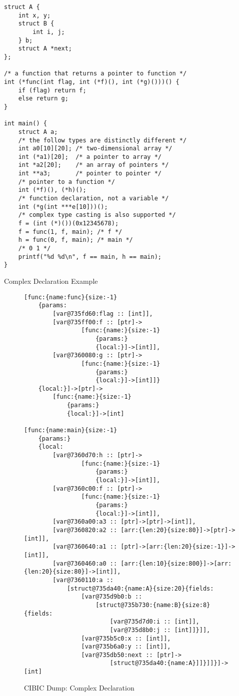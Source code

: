 \documentclass[10pt, a4paper]{article}
\begin{document}
\begin{listing}[H]
    \centering
    \begin{verbatim}
struct A {
    int x, y;
    struct B {
        int i, j;
    } b;
    struct A *next;
};

/* a function that returns a pointer to function */
int (*func(int flag, int (*f)(), int (*g)()))() {
    if (flag) return f;
    else return g;
}

int main() {
    struct A a;
    /* the follow types are distinctly different */
    int a0[10][20]; /* two-dimensional array */
    int (*a1)[20];  /* a pointer to array */
    int *a2[20];    /* an array of pointers */
    int **a3;       /* pointer to pointer */
    /* pointer to a function */
    int (*f)(), (*h)();
    /* function declaration, not a variable */
    int (*g(int ***e[10]))();
    /* complex type casting is also supported */
    f = (int (*)())(0x12345678);
    f = func(1, f, main); /* f */
    h = func(0, f, main); /* main */
    /* 0 1 */
    printf("%d %d\n", f == main, h == main);
}
    \end{verbatim}
 \caption {Complex Declaration Example}
\end{listing}
\begin{figure}[H]
    \centering
    \begin{BVerbatim}
[func:{name:func}{size:-1}
    {params:
        [var@735fd60:flag :: [int]],
        [var@735ff00:f :: [ptr]->
                [func:{name:}{size:-1}
                    {params:}
                    {local:}]->[int]],
        [var@7360080:g :: [ptr]->
                [func:{name:}{size:-1}
                    {params:}
                    {local:}]->[int]]}
    {local:}]->[ptr]->
        [func:{name:}{size:-1}
            {params:}
            {local:}]->[int]

[func:{name:main}{size:-1}
    {params:}
    {local:
        [var@7360d70:h :: [ptr]->
                [func:{name:}{size:-1}
                    {params:}
                    {local:}]->[int]],
        [var@7360c00:f :: [ptr]->
                [func:{name:}{size:-1}
                    {params:}
                    {local:}]->[int]],
        [var@7360a00:a3 :: [ptr]->[ptr]->[int]],
        [var@7360820:a2 :: [arr:{len:20}{size:80}]->[ptr]->[int]],
        [var@7360640:a1 :: [ptr]->[arr:{len:20}{size:-1}]->[int]],
        [var@7360460:a0 :: [arr:{len:10}{size:800}]->[arr:{len:20}{size:80}]->[int]],
        [var@7360110:a :: 
            [struct@735da40:{name:A}{size:20}{fields:
                [var@735d9b0:b :: 
                    [struct@735b730:{name:B}{size:8}{fields:
                        [var@735d7d0:i :: [int]],
                        [var@735d8b0:j :: [int]]}]],
                [var@735b5c0:x :: [int]],
                [var@735b6a0:y :: [int]],
                [var@735db50:next :: [ptr]->
                        [struct@735da40:{name:A}]]}]]}]->[int]

    \end{BVerbatim}
    \caption {CIBIC Dump: Complex Declaration}
\end{figure}
\end{document}
